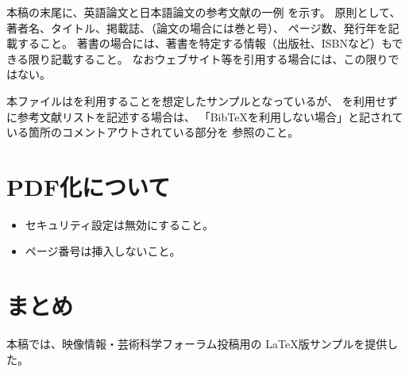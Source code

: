 本稿の末尾に、英語論文と日本語論文の参考文献の一例 \cite{Ito04} を示す。
原則として、著者名、タイトル、掲載誌、（論文の場合には巻と号）、
ページ数、発行年を記載すること。
著書の場合には、著書を特定する情報（出版社、ISBNなど）もできる限り記載すること。
なおウェブサイト等\cite{ArtScience}を引用する場合には、この限りではない。

本ファイルは\BibTeX を利用することを想定したサンプルとなっているが、
\BibTeX を利用せずに参考文献リストを記述する場合は、
「BibTeXを利用しない場合」と記されている箇所のコメントアウトされている部分を
参照のこと。

\section{PDF化について}
\begin{itemize}
\item セキュリティ設定は無効にすること。
\item ページ番号は挿入しないこと。
\end{itemize}

\section{まとめ}

本稿では、映像情報・芸術科学フォーラム投稿用の \LaTeX 版サンプルを提供した。
